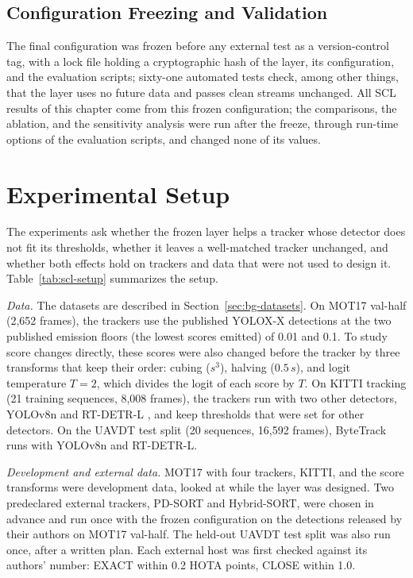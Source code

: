 \subsection{Configuration Freezing and Validation}\label{sec:scl-freeze}
The final configuration was frozen before any external test as a version-control tag, with a lock file holding a cryptographic hash of the layer, its configuration, and the evaluation scripts; sixty-one automated tests check, among other things, that the layer uses no future data and passes clean streams unchanged. All SCL results of this chapter come from this frozen configuration; the comparisons, the ablation, and the sensitivity analysis were run after the freeze, through run-time options of the evaluation scripts, and changed none of its values.

\section{Experimental Setup}\label{sec:scl-setup}
The experiments ask whether the frozen layer helps a tracker whose detector does not fit its thresholds, whether it leaves a well-matched tracker unchanged, and whether both effects hold on trackers and data that were not used to design it. Table~\ref{tab:scl-setup} summarizes the setup.

\emph{Data.} The datasets are described in Section~\ref{sec:bg-datasets}. On MOT17 val-half (2,652 frames), the trackers use the published YOLOX-X detections \cite{ge2021yolox} at the two published emission floors (the lowest scores emitted) of 0.01 and 0.1. To study score changes directly, these scores were also changed before the tracker by three transforms that keep their order: cubing ($s^3$), halving ($0.5\,s$), and logit temperature $T=2$, which divides the logit of each score by $T$. On KITTI tracking (21 training sequences, 8,008 frames), the trackers run with two other detectors, YOLOv8n \cite{jocher2023yolov8} and RT-DETR-L \cite{zhao2024rtdetr}, and keep thresholds that were set for other detectors. On the UAVDT test split (20 sequences, 16,592 frames), ByteTrack runs with YOLOv8n and RT-DETR-L.

\emph{Development and external data.} MOT17 with four trackers, KITTI, and the score transforms were development data, looked at while the layer was designed. Two predeclared external trackers, PD-SORT and Hybrid-SORT, were chosen in advance and run once with the frozen configuration on the detections released by their authors on MOT17 val-half. The held-out UAVDT test split was also run once, after a written plan. Each external host was first checked against its authors' number: EXACT within 0.2 HOTA points, CLOSE within 1.0.


